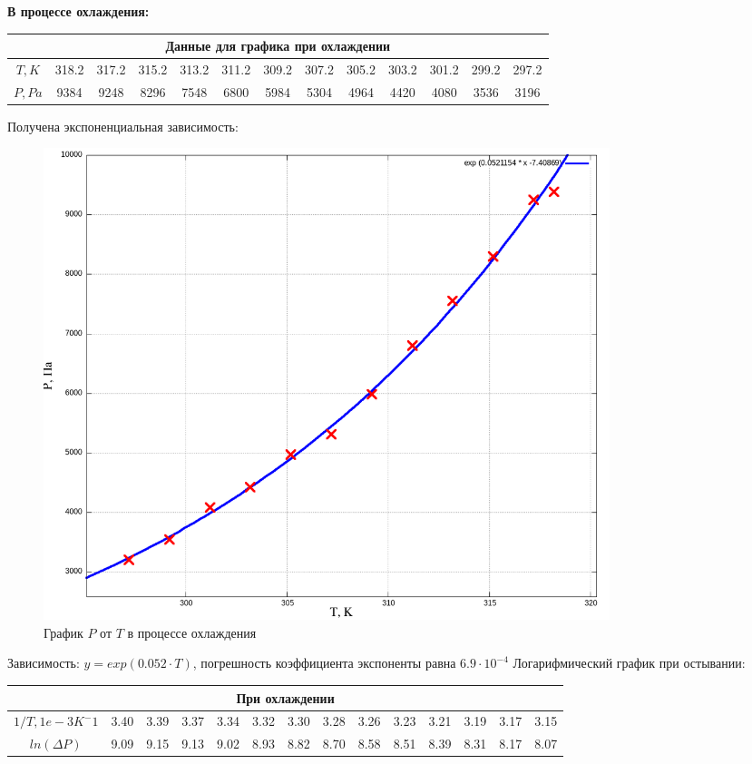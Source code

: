 \documentclass[a4paper,10pt]{article} %
\begin{document}
\textbf{В процессе охлаждения:}


\begin{center}
\begin{tabular}{|c|c|c|c|c|c|c|c|c|c|c|c|c|}
\hline
\multicolumn{13}{|c|}{Данные для графика при охлаждении}\\
\hline
$T, K$&318.2&317.2&315.2&313.2&311.2&309.2&307.2&305.2&303.2&301.2&299.2&297.2\\\hline
$P, Pa$&9384&9248&8296&7548&6800&5984&5304&4964&4420&4080&3536&3196\\\hline
\end{tabular}
\end{center}

Получена экспоненциальная зависимость: 

\begin{figure}[H]
	\centering
	\includegraphics[width=0.8\textwidth]{2-4-1-3-res.png}
	\caption{График $P$ от $T$ в процессе охлаждения}
\end{figure}

Зависимость: $y = exp(0.052\cdot T)$, погрешность коэффициента экспоненты равна $6.9\cdot 10^{-4}$
Логарифмический график при остывании:

\begin{tabular}{|c|c|c|c|c|c|c|c|c|c|c|c|c|c|}
\hline
\multicolumn{14}{|c|}{При охлаждении}\\
\hline
$1/T, 1e-3 K^-1$&3.40&3.39&3.37&3.34&3.32&3.30&3.28&3.26&3.23&3.21&3.19&3.17&3.15\\\hline
$ln(\Delta P)$&9.09&9.15&9.13&9.02&8.93&8.82&8.70&8.58&8.51&8.39&8.31&8.17&8.07\\\hline
\end{tabular}
\end{document}
